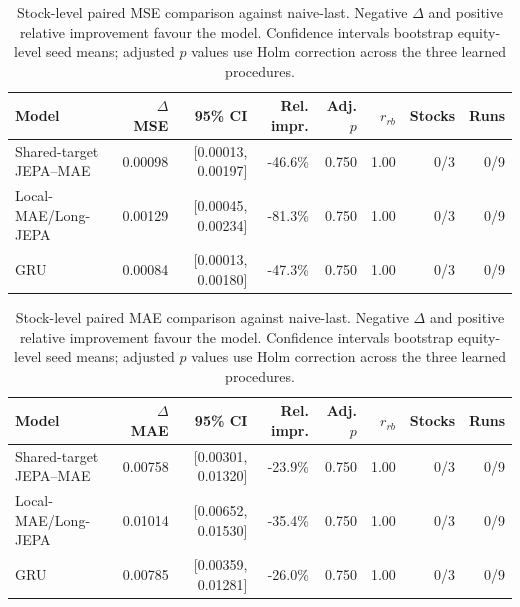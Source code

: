 \begin{table}[t]
\centering
\small
\caption{Stock-level paired MSE comparison against naive-last. Negative $\Delta$ and positive relative improvement favour the model. Confidence intervals bootstrap equity-level seed means; adjusted $p$ values use Holm correction across the three learned procedures.}
\label{tab:paired_mse_naive}
\begin{tabular}{lrrrrrrr}
\toprule
Model & $\Delta$MSE & 95\% CI & Rel. impr. & Adj. $p$ & $r_{rb}$ & Stocks & Runs \\
\midrule
Shared-target JEPA--MAE & 0.00098 & [0.00013, 0.00197] & -46.6\% & 0.750 & 1.00 & 0/3 & 0/9 \\
Local-MAE/Long-JEPA & 0.00129 & [0.00045, 0.00234] & -81.3\% & 0.750 & 1.00 & 0/3 & 0/9 \\
GRU & 0.00084 & [0.00013, 0.00180] & -47.3\% & 0.750 & 1.00 & 0/3 & 0/9 \\
\bottomrule
\end{tabular}
\end{table}

\begin{table}[t]
\centering
\small
\caption{Stock-level paired MAE comparison against naive-last. Negative $\Delta$ and positive relative improvement favour the model. Confidence intervals bootstrap equity-level seed means; adjusted $p$ values use Holm correction across the three learned procedures.}
\label{tab:paired_mae_naive}
\begin{tabular}{lrrrrrrr}
\toprule
Model & $\Delta$MAE & 95\% CI & Rel. impr. & Adj. $p$ & $r_{rb}$ & Stocks & Runs \\
\midrule
Shared-target JEPA--MAE & 0.00758 & [0.00301, 0.01320] & -23.9\% & 0.750 & 1.00 & 0/3 & 0/9 \\
Local-MAE/Long-JEPA & 0.01014 & [0.00652, 0.01530] & -35.4\% & 0.750 & 1.00 & 0/3 & 0/9 \\
GRU & 0.00785 & [0.00359, 0.01281] & -26.0\% & 0.750 & 1.00 & 0/3 & 0/9 \\
\bottomrule
\end{tabular}
\end{table}
